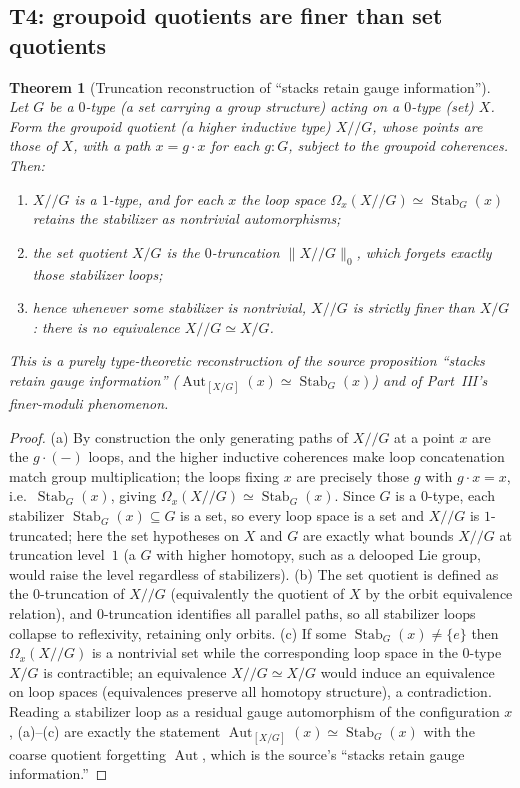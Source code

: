 \documentclass[12pt]{article}
\newtheorem{theorem}{Theorem}[section]
\theoremstyle{definition}
\theoremstyle{remark}
\newcommand{\Aut}{\operatorname{Aut}}
\newcommand{\Stab}{\operatorname{Stab}}
\begin{document}
\subsection{T4: groupoid quotients are finer than set quotients}

\begin{theorem}[Truncation reconstruction of ``stacks retain gauge information'']
\label{thm:truncation}
Let $G$ be a $0$-type (a set carrying a group structure) acting on a $0$-type
(set) $X$. Form the \emph{groupoid quotient} (a higher inductive type)
$X/\!/G$, whose points are those of $X$, with a path $x=g\cdot x$ for each
$g:G$, subject to the groupoid coherences. Then:
\begin{enumerate}
\item[(a)] $X/\!/G$ is a $1$-type, and for each $x$ the loop space
$\Omega_x(X/\!/G)\simeq\Stab_G(x)$ retains the stabilizer as nontrivial
automorphisms;
\item[(b)] the set quotient $X/G$ is the $0$-truncation
$\lVert X/\!/G\rVert_0$, which forgets exactly those stabilizer loops;
\item[(c)] hence whenever some stabilizer is nontrivial, $X/\!/G$ is strictly
finer than $X/G$: there is no equivalence $X/\!/G\simeq X/G$.
\end{enumerate}
This is a purely type-theoretic reconstruction of the source proposition
``stacks retain gauge information'' ($\Aut_{[X/G]}(x)\simeq\Stab_G(x)$) and of
Part~III's finer-moduli phenomenon.
\end{theorem}

\begin{proof}
(a) By construction the only generating paths of $X/\!/G$ at a point $x$ are the
$g\cdot(-)$ loops, and the higher inductive coherences make loop concatenation
match group multiplication; the loops fixing $x$ are precisely those $g$ with
$g\cdot x=x$, i.e.\ $\Stab_G(x)$, giving
$\Omega_x(X/\!/G)\simeq\Stab_G(x)$. Since $G$ is a $0$-type, each stabilizer
$\Stab_G(x)\subseteq G$ is a set, so every loop space is a set and $X/\!/G$ is
$1$-truncated; here the set hypotheses on $X$ and $G$ are exactly what bounds
$X/\!/G$ at truncation level~$1$ (a $G$ with higher homotopy, such as a delooped
Lie group, would raise the level regardless of stabilizers). (b) The set
quotient is defined as the
$0$-truncation of $X/\!/G$ (equivalently the quotient of $X$ by the orbit
equivalence relation), and $0$-truncation identifies all parallel paths, so all
stabilizer loops collapse to reflexivity, retaining only orbits. (c) If some
$\Stab_G(x)\ne\{e\}$ then $\Omega_x(X/\!/G)$ is a nontrivial set while the
corresponding loop space in the $0$-type $X/G$ is contractible; an equivalence
$X/\!/G\simeq X/G$ would induce an equivalence on loop spaces (equivalences
preserve all homotopy structure), a contradiction. Reading a stabilizer loop as a
residual gauge automorphism of the configuration $x$, (a)--(c) are exactly the
statement $\Aut_{[X/G]}(x)\simeq\Stab_G(x)$ with the coarse quotient forgetting
$\Aut$, which is the source's ``stacks retain gauge information.''
\end{proof}
\end{document}
